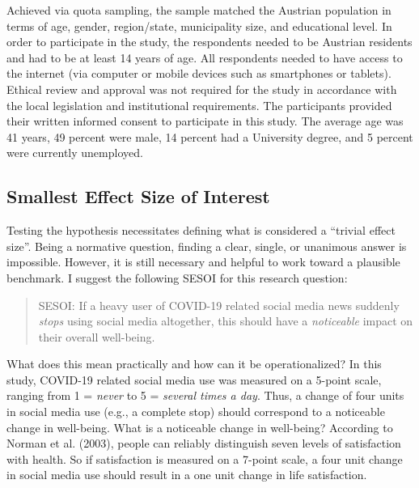 \documentclass[
  man,floatsintext]{apa7}
\begin{document}
Achieved via quota sampling, the sample matched the Austrian population in terms of age, gender, region/state, municipality size, and educational level.
In order to participate in the study, the respondents needed to be Austrian residents and had to be at least 14 years of age.
All respondents needed to have access to the internet (via computer or mobile devices such as smartphones or tablets).
Ethical review and approval was not required for the study in accordance with the local legislation and institutional requirements.
The participants provided their written informed consent to participate in this study.
The average age was 41 years, 49 percent were male, 14 percent had a University degree, and 5 percent were currently unemployed.

\hypertarget{smallest-effect-size-of-interest}{%
\subsection{Smallest Effect Size of Interest}\label{smallest-effect-size-of-interest}}

Testing the hypothesis necessitates defining what is considered a ``trivial effect size''.
Being a normative question, finding a clear, single, or unanimous answer is impossible.
However, it is still necessary and helpful to work toward a plausible benchmark.
I suggest the following SESOI for this research question:

\begin{quote}
SESOI: If a heavy user of COVID-19 related social media news suddenly \emph{stops} using social media altogether, this should have a \emph{noticeable} impact on their overall well-being.
\end{quote}

What does this mean practically and how can it be operationalized?
In this study, COVID-19 related social media use was measured on a 5-point scale, ranging from 1 = \emph{never} to 5 = \emph{several times a day}. Thus, a change of four units in social media use (e.g., a complete stop) should correspond to a noticeable change in well-being.
What is a noticeable change in well-being?
According to Norman et al. (2003), people can reliably distinguish seven levels of satisfaction with health.
So if satisfaction is measured on a 7-point scale, a four unit change in social media use should result in a one unit change in life satisfaction.
\end{document}
